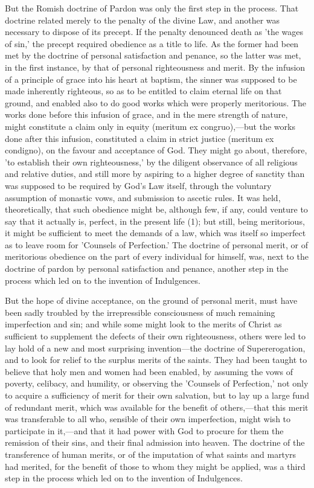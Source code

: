 \documentclass[
]{book}
\begin{document}
But the Romish doctrine of Pardon was only the first step in the process. That doctrine related merely to the penalty of the divine Law, and another was necessary to dispose of its precept. If the penalty denounced death as 'the wages of sin,' the precept required obedience as a title to life. As the former had been met by the doctrine of personal satisfaction and penance, so the latter was met, in the first instance, by that of personal righteousness and merit. By the infusion of a principle of grace into his heart at baptism, the sinner was supposed to be made inherently righteous, so as to be entitled to claim eternal life on that ground, and enabled also to do good works which were properly meritorious. The works done before this infusion of grace, and in the mere strength of nature, might constitute a claim only in equity (meritum ex congruo),---but the works done after this infusion, constituted a claim in strict justice (meritum ex condigno), on the favour and acceptance of God. They might go about, therefore, 'to establish their own righteousness,' by the diligent observance of all religious and relative duties, and still more by aspiring to a higher degree of sanctity than was supposed to be required by God's Law itself, through the voluntary assumption of monastic vows, and submission to ascetic rules. It was held, theoretically, that such obedience might be, although few, if any, could venture to say that it actually is, perfect, in the present life (1); but still, being meritorious, it might be sufficient to meet the demands of a law, which was itself so imperfect as to leave room for 'Counsels of Perfection.' The doctrine of personal merit, or of meritorious obedience on the part of every individual for himself, was, next to the doctrine of pardon by personal satisfaction and penance, another step in the process which led on to the invention of Indulgences.

But the hope of divine acceptance, on the ground of personal merit, must have been sadly troubled by the irrepressible consciousness of much remaining imperfection and sin; and while some might look to the merits of Christ as sufficient to supplement the defects of their own righteousness, others were led to lay hold of a new and most surprising invention---the doctrine of Supererogation, and to look for relief to the surplus merits of the saints. They had been taught to believe that holy men and women had been enabled, by assuming the vows of poverty, celibacy, and humility, or observing the 'Counsels of Perfection,' not only to acquire a sufficiency of merit for their own salvation, but to lay up a large fund of redundant merit, which was available for the benefit of others,---that this merit was transferable to all who, sensible of their own imperfection, might wish to participate in it,---and that it had power with God to procure for them the remission of their sins, and their final admission into heaven. The doctrine of the transference of human merits, or of the imputation of what saints and martyrs had merited, for the benefit of those to whom they might be applied, was a third step in the process which led on to the invention of Indulgences.
\end{document}
